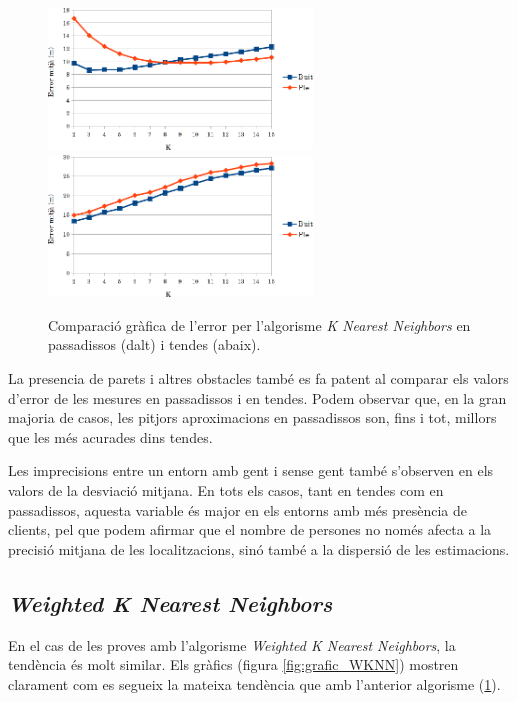 \begin{figure}[ht]
\begin{center}
\includegraphics[width=7cm]{imatges/knn_passadis.png}
\includegraphics[width=7cm]{imatges/knn_tenda.png}
\caption{Comparació gràfica de l'error per l'algorisme \textit{K Nearest Neighbors} en passadissos (dalt) i tendes (abaix).}
\label{fig:grafic_KNN}
\end{center}
\end{figure}

La presencia de parets i altres obstacles també es fa patent al comparar els valors d'error de les mesures en passadissos i en tendes. Podem observar que, en la gran majoria de casos, les pitjors aproximacions en passadissos son, fins i tot, millors que les més acurades dins tendes.

Les imprecisions entre un entorn amb gent i sense gent també s'observen en els valors de la desviació mitjana. En tots els casos, tant en tendes com en passadissos, aquesta variable és major en els entorns amb més presència de clients, pel que podem afirmar que el nombre de persones no només afecta a la precisió mitjana de les localitzacions, sinó també a la dispersió de les estimacions.

\subsection{\textit{Weighted K Nearest Neighbors}}

En el cas de les proves amb l'algorisme \textit{Weighted K Nearest Neighbors}, la tendència és molt similar. Els gràfics (figura \ref{fig:grafic_WKNN}) mostren clarament com es segueix la mateixa tendència que amb l'anterior algorisme (\ref{fig:grafic_KNN}).

